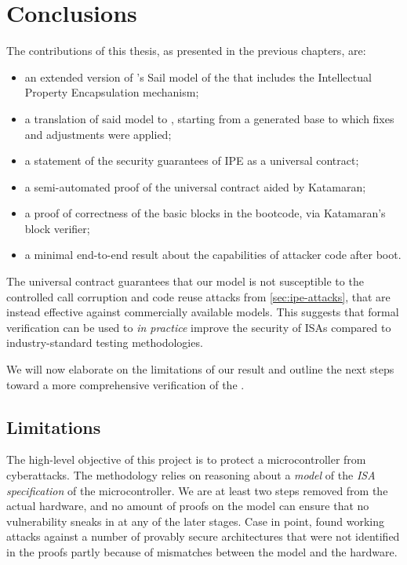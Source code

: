 \chapter{Conclusions}
\label{ch:conclusions}

The contributions of this thesis, as presented in the previous chapters, are:
\begin{itemize}
\item an extended version of \cite{mspthesis}'s Sail model of the \msp that includes the Intellectual Property Encapsulation mechanism;
\item a translation of said model to \usail, starting from a generated base to which fixes and adjustments were applied;
\item a statement of the security guarantees of IPE as a universal contract;
\item a semi-automated proof of the universal contract aided by Katamaran;
\item a proof of correctness of the basic blocks in the \msp bootcode, via Katamaran's block verifier;
\item a minimal end-to-end result about the capabilities of attacker code after boot.
\end{itemize}

The universal contract guarantees that our model is not susceptible to the controlled call corruption and code reuse attacks from \cref{sec:ipe-attacks}, that are instead effective against commercially available \msp models. This suggests that formal verification can be used to \emph{in practice} improve the security of ISAs compared to industry-standard testing methodologies. %

We will now elaborate on the limitations of our result and outline the next steps toward a more comprehensive verification of the \msp.

\section{Limitations}


The high-level objective of this project is to protect a microcontroller from cyberattacks. The methodology relies on reasoning about a \emph{model} of the \emph{ISA specification} of the microcontroller. We are at least two steps removed from the actual hardware, and no amount of proofs on the model can ensure that no vulnerability sneaks in at any of the later stages. Case in point, \cite{Bognar2022} found working attacks against a number of provably secure architectures that were not identified in the proofs partly because of mismatches between the model and the hardware.

